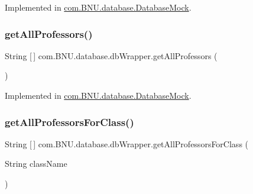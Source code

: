Implemented in \mbox{\hyperlink{classcom_1_1_b_n_u_1_1database_1_1_database_mock_aa42829abfc5c5186e65f1297523facc7}{com.\+B\+N\+U.\+database.\+Database\+Mock}}.

\mbox{\label{interfacecom_1_1_b_n_u_1_1database_1_1db_wrapper_a96dc3be93fc9c8a6e27451d35780fda9}} 
\subsubsection{\texorpdfstring{get\+All\+Professors()}{getAllProfessors()}}
{\footnotesize\ttfamily String \mbox{[}$\,$\mbox{]} com.\+B\+N\+U.\+database.\+db\+Wrapper.\+get\+All\+Professors (\begin{DoxyParamCaption}{ }\end{DoxyParamCaption})}



Implemented in \mbox{\hyperlink{classcom_1_1_b_n_u_1_1database_1_1_database_mock_a17c12ccb19414dfc1efe7a79005d1ee0}{com.\+B\+N\+U.\+database.\+Database\+Mock}}.

\mbox{\label{interfacecom_1_1_b_n_u_1_1database_1_1db_wrapper_a86e057ce56cf8e7c75ee79bfc8bfcd21}} 
\subsubsection{\texorpdfstring{get\+All\+Professors\+For\+Class()}{getAllProfessorsForClass()}}
{\footnotesize\ttfamily String \mbox{[}$\,$\mbox{]} com.\+B\+N\+U.\+database.\+db\+Wrapper.\+get\+All\+Professors\+For\+Class (\begin{DoxyParamCaption}\item[{String}]{class\+Name }\end{DoxyParamCaption})}



